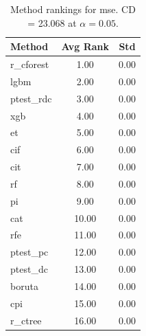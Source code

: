 \begin{table}[h]
\centering
\caption{Method rankings for mse. CD = 23.068 at $\alpha=0.05$.}
\label{tab:ranks_mse}
\begin{tabular}{lcc}
\toprule
Method & Avg Rank & Std \\
\midrule
r_cforest & 1.00 & 0.00 \\
lgbm & 2.00 & 0.00 \\
ptest_rdc & 3.00 & 0.00 \\
xgb & 4.00 & 0.00 \\
et & 5.00 & 0.00 \\
cif & 6.00 & 0.00 \\
cit & 7.00 & 0.00 \\
rf & 8.00 & 0.00 \\
pi & 9.00 & 0.00 \\
cat & 10.00 & 0.00 \\
rfe & 11.00 & 0.00 \\
ptest_pc & 12.00 & 0.00 \\
ptest_dc & 13.00 & 0.00 \\
boruta & 14.00 & 0.00 \\
cpi & 15.00 & 0.00 \\
r_ctree & 16.00 & 0.00 \\
\bottomrule
\end{tabular}
\end{table}
